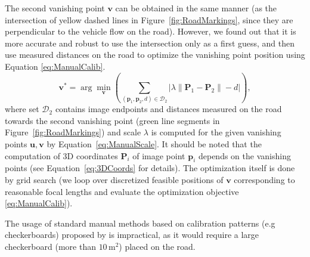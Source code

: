 \documentclass[]{elsarticle}
\begin{document}
\begin{itemize}
	The second vanishing point $\mathbf{v}$ can be obtained in the same manner (as the intersection of yellow dashed lines in Figure~\ref{fig:RoadMarkings}, since they are perpendicular to the vehicle flow on the road). However, we found out that it is more accurate and robust to use the intersection only as a first guess, and then use measured distances on the road to optimize the vanishing point position using Equation \eqref{eq:ManualCalib}.
	\begin{equation}
		\mathbf{v^*} = \arg \min_\mathbf{v} \left( \sum_{(\mathbf{p}_1, \mathbf{p}_2, d) \in \mathcal{D}_2} \left| \lambda \| \mathbf{P}_1 - \mathbf{P}_2 \| - d\right| \right) \label{eq:ManualCalib}, 
	\end{equation}
	where set $\mathcal{D}_2$ contains image endpoints and distances measured on the road towards the second vanishing point (green line segments in Figure~\ref{fig:RoadMarkings}) and scale $\lambda$ is computed for the given vanishing points $\mathbf{u}, \mathbf{v}$ by Equation~\eqref{eq:ManualScale}. It should be noted that the computation of 3D coordinates $\mathbf{P}_i$ of image point $\mathbf{p}_i$ depends on the vanishing points (see Equation~\eqref{eq:3DCoords} for details). The optimization itself is done by grid search (we loop over discretized feasible positions of $\mathbf{v}$ corresponding to reasonable focal lengths and evaluate the optimization objective \eqref{eq:ManualCalib}).
	

	The usage of standard manual methods based on calibration patterns (e.g checkerboards) proposed by \cite{Zhang2000} is impractical, as it would require a large checkerboard (more than $10\,\mathrm{m}^2$) placed on the road.
\end{itemize}
\end{document}
